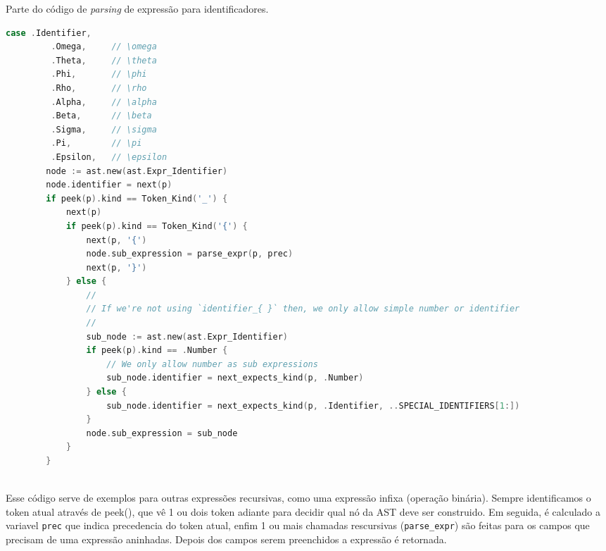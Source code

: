 \begin{codigo}[htb]
    \caption{\small Parte do código de \textit{parsing} de expressão para identificadores. }
        \label{cod-expression-ident-recursive}
  \begin{lstlisting}[language = C]
    case .Identifier,
         .Omega,     // \omega
         .Theta,     // \theta
         .Phi,       // \phi
         .Rho,       // \rho
         .Alpha,     // \alpha
         .Beta,      // \beta
         .Sigma,     // \sigma
         .Pi,        // \pi
         .Epsilon,   // \epsilon
        node := ast.new(ast.Expr_Identifier)
        node.identifier = next(p)
        if peek(p).kind == Token_Kind('_') {
            next(p)
            if peek(p).kind == Token_Kind('{') {
                next(p, '{')
                node.sub_expression = parse_expr(p, prec)
                next(p, '}')
            } else {
                //
                // If we're not using `identifier_{ }` then, we only allow simple number or identifier
                //
                sub_node := ast.new(ast.Expr_Identifier)
                if peek(p).kind == .Number {
                    // We only allow number as sub expressions
                    sub_node.identifier = next_expects_kind(p, .Number)
                } else {
                    sub_node.identifier = next_expects_kind(p, .Identifier, ..SPECIAL_IDENTIFIERS[1:])
                }
                node.sub_expression = sub_node
            }
        }
    
  \end{lstlisting}
\end{codigo}

Esse código serve de exemplos para outras expressões recursivas, como uma expressão infixa (operação binária). Sempre identificamos o token atual através de peek(), que vê 1 ou dois token adiante para decidir qual nó da AST deve ser construido. Em seguida, é calculado a variavel \texttt{prec} que indica precedencia do token atual, enfim 1 ou mais chamadas rescursivas (\texttt{parse\_expr}) são feitas para os campos que precisam de uma expressão aninhadas. Depois dos campos serem preenchidos a expressão é retornada.
